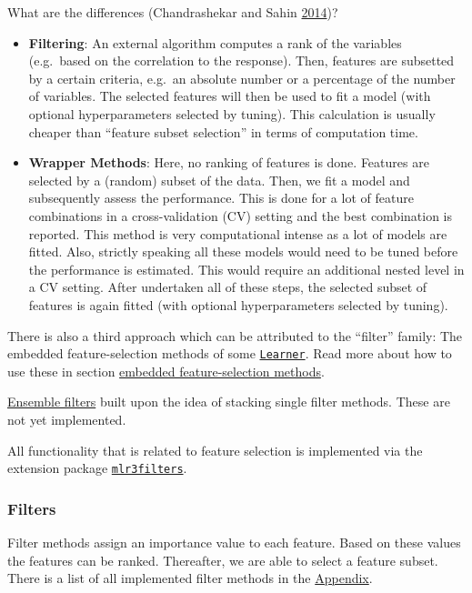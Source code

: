 \documentclass[]{article}
\providecommand{\tightlist}{%
  \setlength{\itemsep}{0pt}\setlength{\parskip}{0pt}}
\begin{document}
What are the differences (Chandrashekar and Sahin \protect\hyperlink{ref-chandrashekar2014}{2014})?

\begin{itemize}
\tightlist
\item
  \textbf{Filtering}: An external algorithm computes a rank of the variables (e.g.~based on the correlation to the response).
  Then, features are subsetted by a certain criteria, e.g.~an absolute number or a percentage of the number of variables.
  The selected features will then be used to fit a model (with optional hyperparameters selected by tuning).
  This calculation is usually cheaper than ``feature subset selection'' in terms of computation time.
\item
  \textbf{Wrapper Methods}: Here, no ranking of features is done.
  Features are selected by a (random) subset of the data.
  Then, we fit a model and subsequently assess the performance.
  This is done for a lot of feature combinations in a cross-validation (CV) setting and the best combination is reported.
  This method is very computational intense as a lot of models are fitted.
  Also, strictly speaking all these models would need to be tuned before the performance is estimated.
  This would require an additional nested level in a CV setting.
  After undertaken all of these steps, the selected subset of features is again fitted (with optional hyperparameters selected by tuning).
\end{itemize}

There is also a third approach which can be attributed to the ``filter'' family:
The embedded feature-selection methods of some \href{https://mlr3.mlr-org.com/reference/Learner.html}{\texttt{Learner}}.
Read more about how to use these in section \protect\hyperlink{fs-embedded}{embedded feature-selection methods}.

\href{\%7B\#fs-ensemble\%7D}{Ensemble filters} built upon the idea of stacking single filter methods.
These are not yet implemented.

All functionality that is related to feature selection is implemented via the extension package \href{https://github.com/mlr-org/mlr3filters}{\texttt{mlr3filters}}.

\hypertarget{fs-filter}{%
\subsubsection{Filters}\label{fs-filter}}

Filter methods assign an importance value to each feature.
Based on these values the features can be ranked.
Thereafter, we are able to select a feature subset.
There is a list of all implemented filter methods in the \protect\hyperlink{list-filters}{Appendix}.
\end{document}
